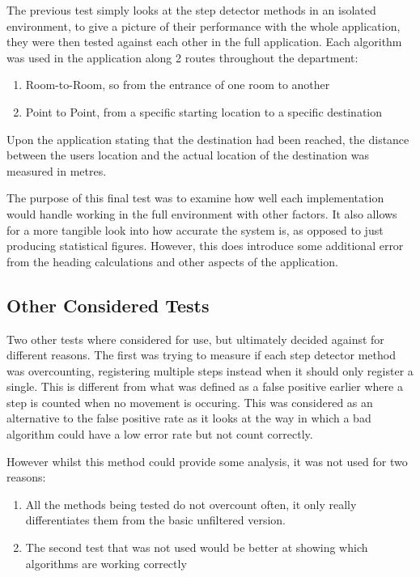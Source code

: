 \documentclass[main.tex]{subfiles}
\begin{document}
The previous test simply looks at the step detector methods in an isolated environment, to give a picture of their performance with the whole application, they were then tested against each other in the full application. Each algorithm was used in the application along 2 routes throughout the department:

\begin{enumerate}
	\item Room-to-Room, so from the entrance of one room to another  %
	\item Point to Point, from a specific starting location to a specific destination  %
\end{enumerate}

Upon the application stating that the destination had been reached, the distance between the users location and the actual location of the destination was measured in metres.

The purpose of this final test was to examine how well each implementation would handle working in the full environment with other factors. It also allows for a more tangible look into how accurate the system is, as opposed to just producing statistical figures. However, this does introduce some additional error from the heading calculations and other aspects of the application.


\subsection{Other Considered Tests}

Two other tests where considered for use, but ultimately decided against for different reasons. The first was trying to measure if each step detector method was overcounting, registering multiple steps instead when it should only register a single. This is different from what was defined as a false positive earlier where a step is counted when no movement is occuring. This was considered as an alternative to the false positive rate as it looks at the way in which a bad algorithm could have a low error rate but not count correctly. 

However whilst this method could provide some analysis, it was not used for two reasons:

\begin{enumerate}
	\item All the methods being tested do not overcount often, it only really differentiates them from the basic unfiltered version.
	\item The second test that was not used would be better at showing which algorithms are working correctly
\end{enumerate}
\end{document}
